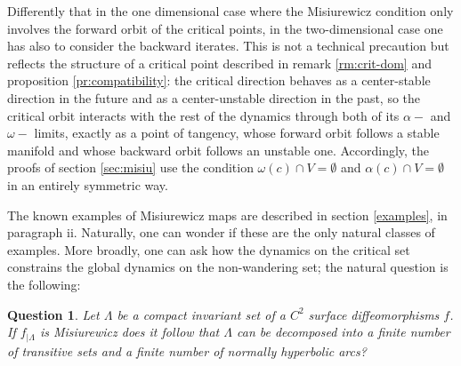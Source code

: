 \documentclass[a4paper,11pt]{article}
\newtheorem{question}[lemma]{Question}
\theoremstyle{definition}
\def\La{\Lambda}
\def\La{\Lambda}
\def\noi{\noindent}
\begin{document}


Differently that in the one dimensional case where the Misiurewicz condition only involves the forward orbit
of the critical points, in the two-dimensional case one has also to consider the backward iterates.   This is not
a technical precaution but reflects the structure of a critical point
described in remark \ref{rm:crit-dom} and proposition \ref{pr:compatibility}:
the critical direction behaves as a center-stable direction in the future and
as a center-unstable direction in the past, so the critical orbit interacts
with the rest of the dynamics through both of its $\alpha-$ and $\omega-$ limits, exactly as a point
of tangency, whose forward orbit follows a stable manifold and whose backward
orbit follows an unstable one. Accordingly, the proofs of section
\ref{sec:misiu} use the condition $\omega(c)\cap V=\emptyset$ and
$\alpha(c)\cap V=\emptyset$ in an entirely symmetric way.
 
The known examples of Misiurewicz maps are described in section \ref{examples}, in paragraph ii. Naturally, one can wonder if these are the only natural classes of examples. More broadly, one can ask how the dynamics on the critical set constrains the global dynamics on the non-wandering set; the natural question is the following: 







\begin{question} \label{misiu3}Let $\La$ be a compact invariant set of a $C^{2}$  surface diffeomorphisms $f$. If  $f_{|\La}$ is   Misiurewicz does it follow that $\Lambda$ can be decomposed into a finite number of transitive sets and a finite number of normally hyperbolic arcs?
 
\end{question}
\end{document}
